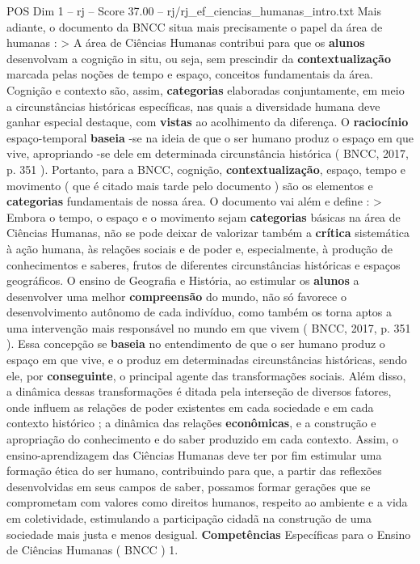 \begin{textsample}{POS Dim 1 – rj – Score 37.00 – rj/rj\_ef\_ciencias\_humanas\_intro.txt}
Mais adiante, o documento da BNCC situa mais precisamente o papel da área de humanas : > A área de Ciências Humanas contribui para que os \textbf{alunos} desenvolvam a cognição in situ, ou seja, sem prescindir da \textbf{contextualização} marcada pelas noções de tempo e espaço, conceitos fundamentais da área.
Cognição e contexto são, assim, \textbf{categorias} elaboradas conjuntamente, em meio a circunstâncias históricas específicas, nas quais a diversidade humana deve ganhar especial destaque, com \textbf{vistas} ao acolhimento da diferença.
O \textbf{raciocínio} espaço-temporal \textbf{baseia} -se na ideia de que o ser humano produz o espaço em que vive, apropriando -se dele em determinada circunstância histórica ( BNCC, 2017, p. 351 ).
Portanto, para a BNCC, cognição, \textbf{contextualização}, espaço, tempo e movimento ( que é citado mais tarde pelo documento ) são os elementos e \textbf{categorias} fundamentais de nossa área.
O documento vai além e define : > Embora o tempo, o espaço e o movimento sejam \textbf{categorias} básicas na área de Ciências Humanas, não se pode deixar de valorizar também a \textbf{crítica} sistemática à ação humana, às relações sociais e de poder e, especialmente, à produção de conhecimentos e saberes, frutos de diferentes circunstâncias históricas e espaços geográficos.
O ensino de Geografia e História, ao estimular os \textbf{alunos} a desenvolver uma melhor \textbf{compreensão} do mundo, não só favorece o desenvolvimento autônomo de cada indivíduo, como também os torna aptos a uma intervenção mais responsável no mundo em que vivem ( BNCC, 2017, p. 351 ).
Essa concepção se \textbf{baseia} no entendimento de que o ser humano produz o espaço em que vive, e o produz em determinadas circunstâncias históricas, sendo ele, por \textbf{conseguinte}, o principal agente das transformações sociais.
Além disso, a dinâmica dessas transformações é ditada pela interseção de diversos fatores, onde influem as relações de poder existentes em cada sociedade e em cada contexto histórico ; a dinâmica das relações \textbf{econômicas}, e a construção e apropriação do conhecimento e do saber produzido em cada contexto.
Assim, o ensino-aprendizagem das Ciências Humanas deve ter por fim estimular uma formação ética do ser humano, contribuindo para que, a partir das reflexões desenvolvidas em seus campos de saber, possamos formar gerações que se comprometam com valores como direitos humanos, respeito ao ambiente e a vida em coletividade, estimulando a participação cidadã na construção de uma sociedade mais justa e menos desigual. \textbf{Competências} Específicas para o Ensino de Ciências Humanas ( BNCC ) 1.

\end{textsample}

